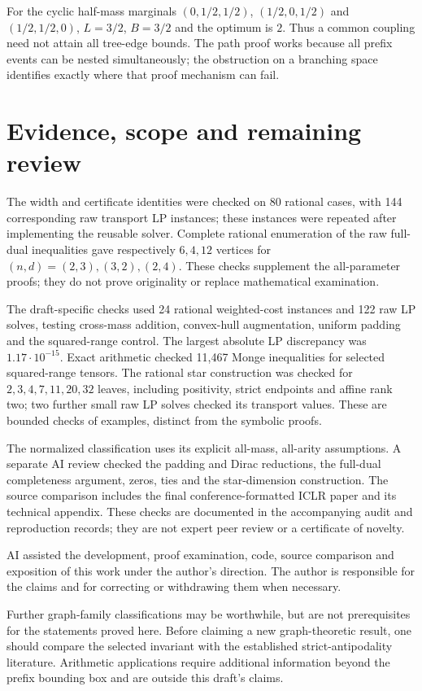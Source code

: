 \documentclass[11pt]{article}
\theoremstyle{definition}\newtheorem{definition}[theorem]{Definition}
\newcommand{\1}{\mathbf 1}
\begin{document}
For the cyclic half-mass marginals $(0,1/2,1/2)$, $(1/2,0,1/2)$ and
$(1/2,1/2,0)$, $L=3/2$, $B=3/2$ and the optimum is $2$. Thus a common
coupling need not attain all tree-edge bounds. The path proof works because all
prefix events can be nested simultaneously; the obstruction on a branching
space identifies exactly where that proof mechanism can fail.

\section{Evidence, scope and remaining review}
The width and certificate identities were checked on 80 rational cases, with
144 corresponding raw transport LP instances; these instances were repeated
after implementing the reusable solver. Complete rational enumeration of the
raw full-dual inequalities gave respectively $6,4,12$ vertices for
$(n,d)=(2,3),(3,2),(2,4)$. These checks supplement the all-parameter proofs;
they do not prove originality or replace mathematical examination.

The draft-specific checks used 24 rational weighted-cost instances and 122
raw LP solves, testing cross-mass addition, convex-hull augmentation, uniform
padding and the squared-range control. The largest absolute LP discrepancy was
$1.17\cdot10^{-15}$. Exact arithmetic checked 11,467 Monge inequalities for
selected squared-range tensors. The rational star construction was checked for
$2,3,4,7,11,20,32$ leaves, including positivity, strict endpoints and affine
rank two; two further small raw LP solves checked its transport values.
These are bounded checks of examples, distinct from the symbolic proofs.

The normalized classification uses its explicit all-mass, all-arity
assumptions. A separate AI review checked the padding and Dirac reductions,
the full-dual completeness argument, zeros, ties and the star-dimension
construction. The source comparison includes the final conference-formatted
ICLR paper and its technical appendix. These checks are documented in the
accompanying audit and reproduction records; they are not expert peer review
or a certificate of novelty.

AI assisted the development, proof examination, code, source comparison and
exposition of this work under the author's direction. The author is responsible
for the claims and for correcting or withdrawing them when necessary.

Further graph-family classifications may be worthwhile, but are not prerequisites
for the statements proved here. Before claiming a new graph-theoretic result,
one should compare the selected invariant with the established strict-antipodality
literature. Arithmetic applications require additional information beyond the
prefix bounding box and are outside this draft's claims.
\end{document}
